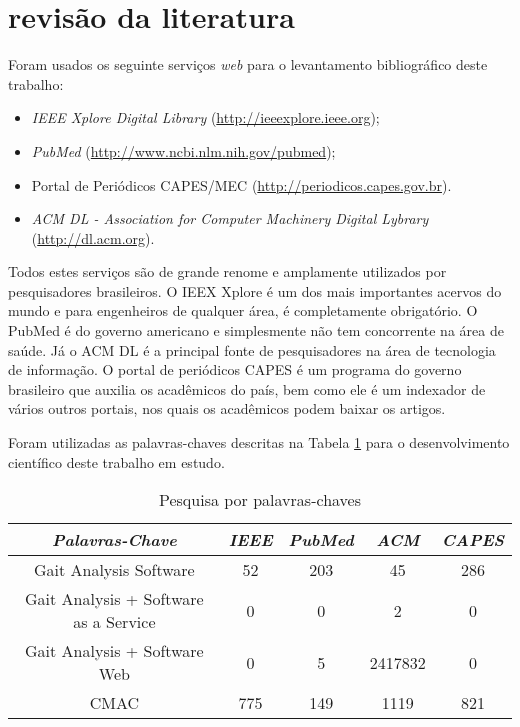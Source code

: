 \section[REVISÃO DA LITERATURA]{revisão da literatura}
Foram usados os seguinte serviços \emph{web} para o levantamento bibliográfico deste trabalho:
\begin{itemize}
	\item \emph{IEEE Xplore Digital Library} (\url{http://ieeexplore.ieee.org});
	\item \emph{PubMed} (\url{http://www.ncbi.nlm.nih.gov/pubmed});
	\item Portal de Periódicos CAPES/MEC (\url{http://periodicos.capes.gov.br}).
	\item \emph{ACM DL - Association for Computer Machinery Digital Lybrary} (\url{http://dl.acm.org}).
\end{itemize}

Todos estes serviços são de grande renome e amplamente utilizados por pesquisadores brasileiros. 
O IEEX Xplore é um dos mais importantes acervos do mundo e para engenheiros de qualquer área, é completamente obrigatório. 
O PubMed é do governo americano e simplesmente não tem concorrente na área de saúde. 
Já o ACM DL é a principal fonte de pesquisadores na área de tecnologia de informação. 
O portal de periódicos CAPES é um programa do governo brasileiro que auxilia os acadêmicos do país, bem como ele é um indexador de vários outros portais, nos quais os acadêmicos podem baixar os artigos.

Foram utilizadas as palavras-chaves descritas na Tabela \ref{palavra_chave} para o desenvolvimento científico deste trabalho em estudo. 
\begin{table}[ht]
	\centering
	\caption{Pesquisa por palavras-chaves}
	\label{palavra_chave}
	\ABNTEXfontereduzida
	\begin{tabular}{c c c c c}
		\toprule
		\textit{Palavras-Chave} & \textit{IEEE} & \textit{PubMed} & \textit{ACM} & \textit{CAPES}\\
		\midrule
		\ABNTEXfontereduzida
		Gait Analysis Software  & 52 & 203 & 45 & 286\\
		Gait Analysis + Software as a Service & 0 & 0 & 2 & 0\\
		Gait Analysis + Software Web  & 0 & 5 & 2417832 & 0\\
		CMAC & 775 & 149 & 1119 & 821\\
		\bottomrule
	\end{tabular}
\end{table}

